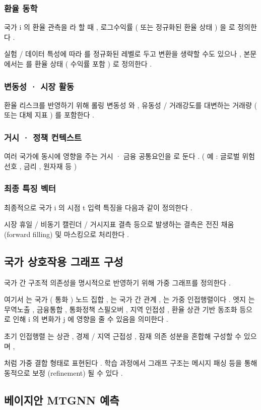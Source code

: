 \documentclass[10pt,a4paper]{article}
\begin{document}
\subsubsection{환율 동학}
국가 i 의 환율 관측을 라 할 때 , 로그수익률 ( 또는 정규화된 환율 상태 ) 을 로 정의한다 .

실험 / 데이터 특성에 따라 를 정규화된 레벨로 두고 변환을 생략할 수도 있으나 , 본문에서는 를 환율 상태 ( 수익률 포함 ) 로 정의한다 .

\subsubsection{변동성 · 시장 활동}
환율 리스크를 반영하기 위해 롤링 변동성 와 , 유동성 / 거래강도를 대변하는 거래량 ( 또는 대체 지표 ) 를 포함한다 .

\subsubsection{거시 · 정책 컨텍스트}
여러 국가에 동시에 영향을 주는 거시 · 금융 공통요인을 로 둔다 . ( 예 : 글로벌 위험선호 , 금리 , 원자재 등 )

\subsubsection{최종 특징 벡터}
최종적으로 국가 i 의 시점 t 입력 특징을 다음과 같이 정의한다 .

시장 휴일 / 비동기 캘린더 / 거시지표 결측 등으로 발생하는 결측은 전진 채움 (forward filling) 및 마스킹으로 처리한다 .

\subsection{국가 상호작용 그래프 구성}
국가 간 구조적 의존성을 명시적으로 반영하기 위해 가중 그래프를 정의한다 .

여기서 는 국가 ( 통화 ) 노드 집합 , 는 국가 간 관계 , 는 가중 인접행렬이다 . 엣지 는 무역노출 , 금융통합 , 통화정책 스필오버 , 지역 인접성 , 환율 상관 기반 동조화 등으로 인해 i 의 변화가 j 에 영향을 줄 수 있음을 의미한다 .

초기 인접행렬 는 상관 , 경제 / 지역 근접성 , 잠재 의존 성분을 혼합해 구성할 수 있으며 ,

처럼 가중 결합 형태로 표현된다 . 학습 과정에서 그래프 구조는 메시지 패싱 등을 통해 동적으로 보정 (refinement) 될 수 있다 .

\subsection{베이지안 MTGNN 예측}
\end{document}
